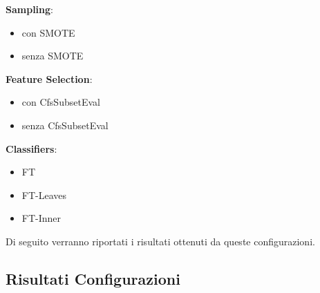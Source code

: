 %
%
%


\textbf{Sampling}:
\begin{itemize}
	\item con SMOTE
	\item senza SMOTE
\end{itemize}

\textbf{Feature Selection}:
\begin{itemize}
	\item con CfsSubsetEval
	\item senza CfsSubsetEval
\end{itemize}

\textbf{Classifiers}:
\begin{itemize}
	\item FT
	\item FT-Leaves
	\item FT-Inner
\end{itemize}

Di seguito verranno riportati i risultati ottenuti da queste configurazioni. 
\subsection{Risultati Configurazioni}

